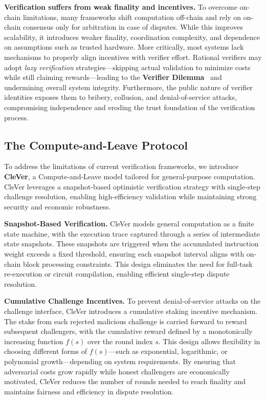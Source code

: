 \documentclass[3p]{elsarticle}
\theoremstyle{remark}
\begin{document}
\textbf{Verification suffers from weak finality and incentives.}  
To overcome on-chain limitations, many frameworks shift computation off-chain and rely on on-chain consensus only for arbitration in case of disputes. While this improves scalability, it introduces weaker finality, coordination complexity, and dependence on assumptions such as trusted hardware. More critically, most systems lack mechanisms to properly align incentives with verifier effort. Rational verifiers may adopt \textit{lazy verification} strategies---skipping actual validation to minimize costs while still claiming rewards---leading to the \textbf{Verifier Dilemma}~\cite{luu} and undermining overall system integrity. Furthermore, the public nature of verifier identities exposes them to bribery, collusion, and denial-of-service attacks, compromising independence and eroding the trust foundation of the verification process.


\subsection{The Compute-and-Leave Protocol}

To address the limitations of current verification frameworks, we introduce \textbf{CleVer}, a Compute-and-Leave model tailored for general-purpose computation. CleVer leverages a snapshot-based optimistic verification strategy with single-step challenge resolution, enabling high-efficiency validation while maintaining strong security and economic robustness.

\textbf{Snapshot-Based Verification.}  
CleVer models general computation as a finite state machine, with the execution trace captured through a series of intermediate state snapshots. These snapshots are triggered when the accumulated instruction weight exceeds a fixed threshold, ensuring each snapshot interval aligns with on-chain block processing constraints. This design eliminates the need for full-task re-execution or circuit compilation, enabling efficient single-step dispute resolution.

\textbf{Cumulative Challenge Incentives.}  
To prevent denial-of-service attacks on the challenge interface, CleVer introduces a cumulative staking incentive mechanism. The stake from each rejected malicious challenge is carried forward to reward subsequent challengers, with the cumulative reward defined by a monotonically increasing function $f(s)$ over the round index $s$. This design allows flexibility in choosing different forms of $f(s)$—such as exponential, logarithmic, or polynomial growth—depending on system requirements. By ensuring that adversarial costs grow rapidly while honest challengers are economically motivated, CleVer reduces the number of rounds needed to reach finality and maintains fairness and efficiency in dispute resolution.
\end{document}
